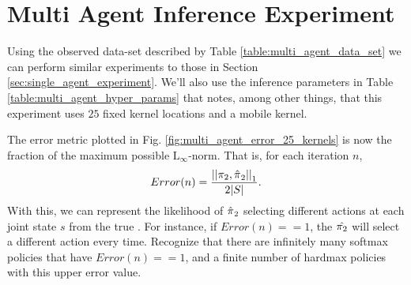     \begin{figure}[H]
        \begin{center}
        \end{center}
\end{figure}

    \begin{figure}[H]
        \begin{center}
        \end{center}
\end{figure}

\section{Multi Agent Inference Experiment}\label{sec:multi_agent_inference_experiment}
Using the observed data-set described by Table \ref{table:multi_agent_data_set} we can perform similar experiments to
those in Section \ref{sec:single_agent_experiment}. We'll also use the inference parameters in Table
\ref{table:multi_agent_hyper_params} that notes, among other things, that this experiment uses $25$ fixed kernel
locations and a mobile kernel.

The error metric plotted in Fig. \ref{fig:multi_agent_error_25_kernels} is now the fraction of the maximum possible
$\text{L}_{\infty}$-norm. That is, for each iteration $n$,
\[
        Error(n) = \frac{\left|\left|\pi_{2},\hat{\pi_{}}_2\right|\right|_1}{2|S|}.
\]
With this, we can represent the likelihood of $\hat{\pi_{}}_2$ selecting different actions at each joint state
$s$ from the true . For instance, if $Error(n)==1$, the $\hat{\pi_{2}}$ will select a different action
every time. Recognize that there are infinitely many softmax policies that have $Error(n)==1$, and a finite number of
hardmax policies with this upper error value.

